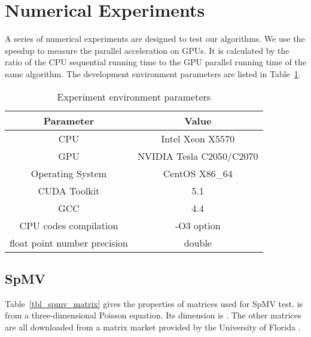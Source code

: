 \documentclass[runningheads,a4paper]{llncs}
\begin{document}
{\section{Numerical Experiments}
\label{sec_experiment}
 A series of numerical experiments are designed to test our algorithms. We use the speedup to measure the parallel acceleration on GPUs. It is calculated by the ratio of the CPU sequential running time to the GPU parallel running time of the same algorithm. The development environment parameters are listed in Table~\ref{tbl_ep}.

\begin{table}[!htb]
\centering
\caption{Experiment environment parameters}
\begin{tabular}{|c|c|} \hline
\bfseries Parameter & \bfseries Value \\ \hline
CPU                             & Intel Xeon X5570          \\ \hline
GPU                             & NVIDIA Tesla C2050/C2070  \\ \hline
Operating System                & CentOS X86\_64            \\ \hline
CUDA Toolkit                    & 5.1                       \\ \hline
GCC                             & 4.4                       \\ \hline
CPU codes compilation           & -O3 option                \\ \hline
float point number precision    & double                    \\ \hline
\end{tabular}
\label{tbl_ep}
\end{table}

\subsection{SpMV}

Table~\ref{tbl_spmv_matrix} gives the properties of matrices used for SpMV test.  is from a three-dimensional Poisson equation. Its dimension is . The other matrices are all downloaded from a matrix market provided by the University of Florida \cite{mmarket}.

}
\end{document}
